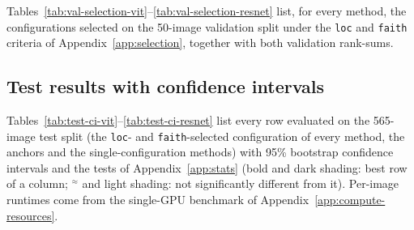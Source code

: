 \documentclass[twoside]{article}
\newcommand{\1}{\mathbf{1}}
\begin{document}
Tables~\ref{tab:val-selection-vit}--\ref{tab:val-selection-resnet} list, for every method, the
configurations selected on the 50-image validation split under the \texttt{loc} and \texttt{faith}
criteria of Appendix~\ref{app:selection}, together with both validation rank-sums.

\begin{table}[H]
    \centering
    \caption{ViT-B/16: validation-selected configurations per method and criterion (\texttt{loc}:
    minimal rank-sum over AL, PG, TK; \texttt{faith}: over PF$_5$, PF$_{20}$, Sel; rank-sums over the
    configurations of one method, lower is better; the number of configurations is given after the
    method name). Symbols: Appendix~\ref{app:config-symbols}.}
    \label{tab:val-selection-vit}
    \small
\end{table}

\begin{table}[H]
    \centering
    \caption{VGG-16: validation-selected configurations per method and criterion, as in
    Table~\ref{tab:val-selection-vit}.}
    \label{tab:val-selection-vgg}
    \small
\end{table}

\begin{table}[H]
    \centering
    \caption{ResNet-50: validation-selected configurations per method and criterion, as in
    Table~\ref{tab:val-selection-vit}.}
    \label{tab:val-selection-resnet}
    \small
\end{table}

\subsection{Test results with confidence intervals}\label{app:test-ci}

Tables~\ref{tab:test-ci-vit}--\ref{tab:test-ci-resnet} list every row evaluated on the 565-image
test split (the \texttt{loc}- and \texttt{faith}-selected configuration of every method, the
anchors and the single-configuration methods) with 95\% bootstrap confidence intervals and the
tests of Appendix~\ref{app:stats} (bold and dark shading: best row of a column; $^{\approx}$ and
light shading: not significantly different from it). Per-image runtimes come from the single-GPU
benchmark of Appendix~\ref{app:compute-resources}.
\end{document}
